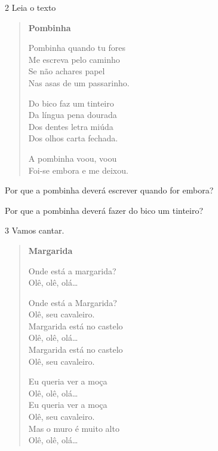 \num{2} Leia o texto

\begin{myquote}
\begin{verse}
\textbf{Pombinha}

Pombinha quando tu fores\\
Me escreva pelo caminho\\
Se não achares papel\\
Nas asas de um passarinho.

Do bico faz um tinteiro\\
Da língua pena dourada\\
Dos dentes letra miúda\\
Dos olhos carta fechada.

A pombinha voou, voou\\
Foi-se embora e me deixou.
\end{verse}

\end{myquote}

\begin{escolha}
\item Por que a pombinha deverá escrever quando for embora?


\item Por que a pombinha deverá fazer do bico um tinteiro?


\end{escolha}

\num{3} Vamos cantar.


\begin{myquote}
\begin{verse}
\textbf{Margarida}

Onde está a margarida?\\
Olê, olê, olá…

Onde está a Margarida?\\
Olê, seu cavaleiro.\\
Margarida está no castelo\\
Olê, olê, olá…\\
Margarida está no castelo\\
Olê, seu cavaleiro.

Eu queria ver a moça\\
Olê, olê, olá…\\
Eu queria ver a moça\\
Olê, seu cavaleiro.\\
Mas o muro é muito alto\\
Olê, olê, olá…
\end{verse}

\end{myquote}

